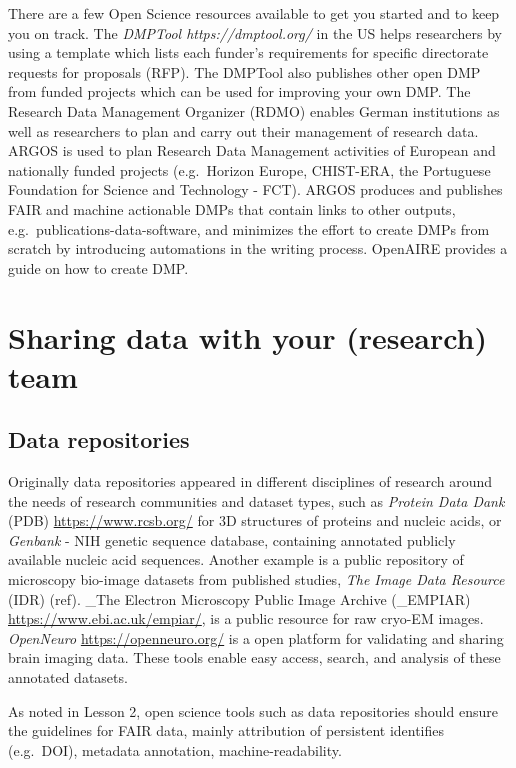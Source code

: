 \documentclass[
  letterpaper,
  DIV=11,
  numbers=noendperiod]{scrreport}
\begin{document}
There are a few Open Science resources available to get you started and
to keep you on track. The \emph{DMPTool https://dmptool.org/} in the US
helps researchers by using a template which lists each funder's
requirements for specific directorate requests for proposals (RFP). The
DMPTool also publishes other open DMP from funded projects which can be
used for improving your own DMP. The Research Data Management Organizer
(RDMO) enables German institutions as well as researchers to plan and
carry out their management of research data. ARGOS is used to plan
Research Data Management activities of European and nationally funded
projects (e.g.~Horizon Europe, CHIST-ERA, the Portuguese Foundation for
Science and Technology - FCT). ARGOS produces and publishes FAIR and
machine actionable DMPs that contain links to other outputs,
e.g.~publications-data-software, and minimizes the effort to create DMPs
from scratch by introducing automations in the writing process. OpenAIRE
provides a guide on how to create DMP.

\hypertarget{sharing-data-with-your-research-team}{%
\section{Sharing data with your (research)
team}\label{sharing-data-with-your-research-team}}

\hypertarget{data-repositories}{%
\subsection{Data repositories}\label{data-repositories}}

Originally data repositories appeared in different disciplines of
research around the needs of research communities and dataset types,
such as \emph{Protein Data Dank }(PDB) \url{https://www.rcsb.org/} for
3D structures of proteins and nucleic acids, or \emph{Genbank} - NIH
genetic sequence database, containing annotated publicly available
nucleic acid sequences. Another example is a public repository of
microscopy bio-image datasets from published studies, \emph{The Image
Data Resource} (IDR) (ref). \_The Electron Microscopy Public Image
Archive (\_EMPIAR) \url{https://www.ebi.ac.uk/empiar/}, is a public
resource for raw cryo-EM images. \emph{OpenNeuro}
\url{https://openneuro.org/} is a open platform for validating and
sharing brain imaging data. These tools enable easy access, search, and
analysis of these annotated datasets.

As noted in Lesson 2, open science tools such as data repositories
should ensure the guidelines for FAIR data, mainly attribution of
persistent identifies (e.g.~DOI), metadata annotation,
machine-readability.
\end{document}
